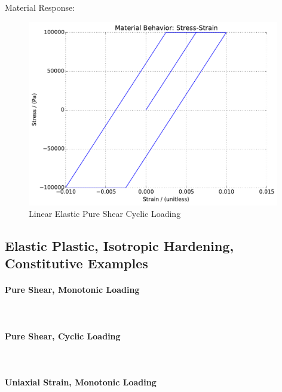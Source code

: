 \documentclass[fleqn,11pt]{article}
\begin{document}
Material Response:
\begin{figure}[H]
\begin{center}
\includegraphics[width=11cm]{../fei_examples/4_1_perfectly_plastic/4uniaxial_strain_cyclic_loading/result.pdf}
\caption{
\label{linear_elastic_shear_mono}
Linear Elastic Pure Shear Cyclic Loading}
\end{center}
\end{figure}





\subsection{Elastic Plastic, Isotropic Hardening, Constitutive Examples}



\paragraph{Pure Shear, Monotonic Loading} ~

\paragraph{Pure Shear, Cyclic Loading} ~


\paragraph{Uniaxial Strain, Monotonic Loading} ~
\end{document}
